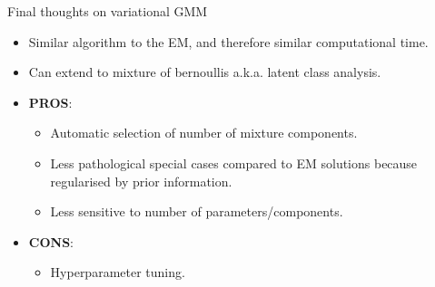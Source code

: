 \begin{frame}{Final thoughts on variational GMM}
  \begin{itemize}
    \item Similar algorithm to the EM, and therefore similar computational time.
    \item Can extend to mixture of bernoullis a.k.a. latent class analysis. 
    \item \textbf{PROS}:
    \begin{itemize}
      \item Automatic selection of number of mixture components.
      \item Less pathological special cases compared to EM solutions because regularised by prior information.
      \item Less sensitive to number of parameters/components.
    \end{itemize}
    \item \textbf{CONS}:
    \begin{itemize}
      \item Hyperparameter tuning.
    \end{itemize}
  \end{itemize}
\end{frame}
